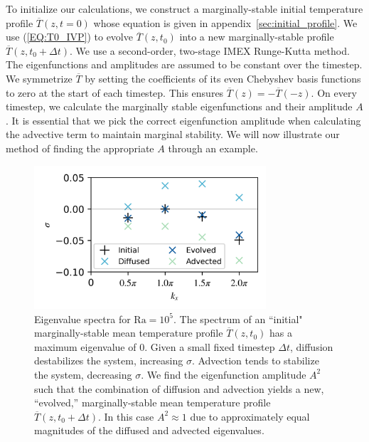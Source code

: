 \documentclass[reprint,amsmath,amssymb,aps,nofootinbib]{revtex4-1}
\newcommand\Ra{\mathrm{Ra}}
\newcommand{\eq}[1]{(\ref{#1})}
\begin{document}


To initialize our calculations, we construct a marginally-stable initial temperature profile $\overline{T}(z, t=0)$ whose equation is given in appendix~\ref{sec:initial_profile}. 
We use \eq{EQ:T0_IVP} to evolve $\overline{T}(z, t_0)$ into a new marginally-stable profile $\overline{T}(z, t_0 + \Delta t)$.
We use a second-order, two-stage IMEX Runge-Kutta method.
The eigenfunctions and amplitudes are assumed to be constant over the timestep.
We symmetrize $\overline{T}$ by setting the coefficients of its even Chebyshev basis functions to zero at the start of each timestep.
This ensures $\overline{T}(z) = -\overline{T}(-z)$.
On every timestep, we calculate the marginally stable eigenfunctions and their amplitude $A$.
It is essential that we pick the correct eigenfunction amplitude when calculating the advective term to maintain marginal stability.
We will now illustrate our method of finding the appropriate $A$ through an example.

\begin{figure}
    \includegraphics[width=3.4in]{EV_spectrum_ol.png}
    \caption{Eigenvalue spectra for $\Ra = 10^5$. The spectrum of an ``initial" marginally-stable mean temperature profile $\overline{T}(z, t_0)$ has a maximum eigenvalue of 0. 
    Given a small fixed timestep $\Delta t$, diffusion destabilizes the system, increasing $\sigma$. 
    Advection tends to stabilize the system, decreasing $\sigma$. 
    We find the eigenfunction amplitude $A^2$ such that the combination of diffusion and advection yields a new, ``evolved,'' marginally-stable mean temperature profile $\overline{T}(z, t_0 + \Delta t)$. In this case $A^2 \approx 1$ due to approximately equal magnitudes of the diffused and advected eigenvalues.}
    \label{fig:iteration_spectra} 
\end{figure}
\end{document}
